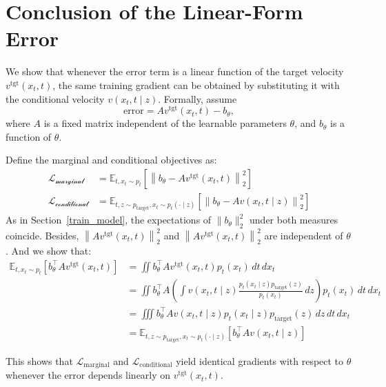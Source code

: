 \section{Conclusion of the Linear-Form Error}\label{app:linear_func}
We show that whenever the error term is a linear function of the target velocity $v^\text{tgt}(x_t,t)$, the same training gradient can be obtained by substituting it with the conditional velocity $v(x_t,t \mid z)$.
%
Formally, assume
\begin{equation*}
\text{error} = A v^\text{tgt}(x_t, t) - b_\theta,
\end{equation*}
%
where $A$ is a fixed matrix independent of the learnable parameters $\theta$, and $b_\theta$ is a function of $\theta$.


Define the marginal and conditional objectives as:
%
\begin{align}
  \mathcal{L_\text{marginal}} &= \mathbb{E}_{t, x_t \sim p_t} \left[ \left\| b_\theta - A v^\text{tgt} (x_t, t) \right\|_2^2 \right] \\
  \mathcal{L_\text{conditional}} &=  \mathbb{E}_{t, z \sim p_\text{target}, x_t \sim p_t(\cdot \mid z)} \left[ \left\| b_\theta - A v (x_t, t \mid z) \right\|_2^2 \right]
\end{align}
%
As in Section~\ref{train_model}, the expectations of $\|b_\theta\|_2^2$ under both measures coincide.
%
Besides, $\left\| A v^\text{tgt} (x_t, t) \right\|_2^2$ and $\left\| A v^\text{tgt} (x_t, t) \right\|_2^2$ are independent of $\theta$.
%
And we show that:
%
\begin{align*}
\mathbb{E}_{t, x_t \sim p_t} \left[ b_\theta^\top A v^\text{tgt}(x_t, t) \right] &= \iint b_\theta^\top A v^\text{tgt}(x_t, t) p_t(x_t) \, dt \, dx_t \\
&= \iint b_\theta^\top A \left( \int v(x_t, t \mid z) \frac{p_t(x_t \mid z) p_\text{target}(z)}{p_t(x_t)} \, dz \right) p_t(x_t) \, dt \, dx_t \\
&= \iiint b_\theta^\top A v(x_t, t \mid z) p_t(x_t \mid z) p_\text{target}(z) \, dz \, dt \, dx_t \\
&= \mathbb{E}_{t, z \sim p_\text{target}, x_t \sim p_t(\cdot \mid z)} \left[ b_\theta^\top A v(x_t, t \mid z) \right]
\end{align*}

This shows that $\mathcal{L}_\text{marginal}$ and $\mathcal{L}_\text{conditional}$ yield identical gradients with respect to $\theta$ whenever the error depends linearly on $v^\text{tgt}(x_t,t)$.
